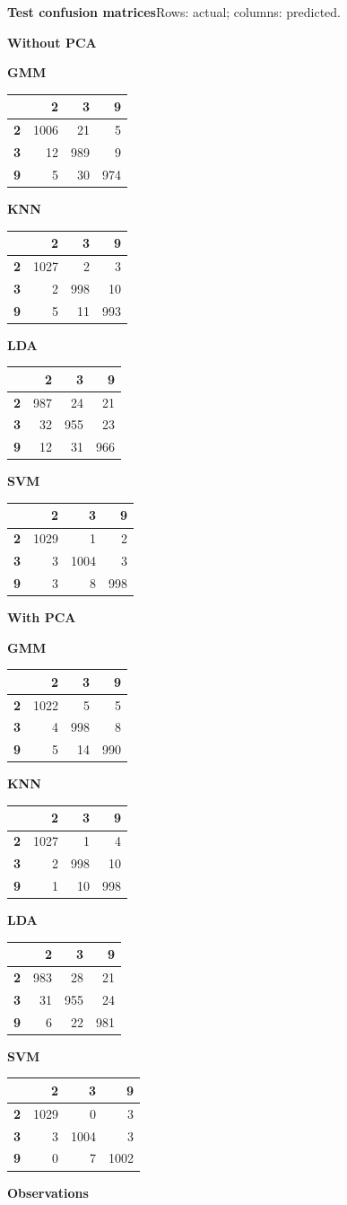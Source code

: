 \documentclass[11pt,a4paper]{article}
\makeatletter
\renewcommand{\arraystretch}{1.12}
\newcommand{\sectiongap}{\par\vspace{9mm}}
\newcommand{\confusion}[3]{%
  \begin{minipage}[t]{0.24\linewidth}
  \setlength{\parskip}{0pt}\centering
  \textbf{#1}\par\vspace{4pt}
  {\normalsize\setlength{\tabcolsep}{2.5pt}%
  \renewcommand{\arraystretch}{1.02}%
  \begin{tabular}{r@{\quad}#2}\toprule
  #3
  \bottomrule\end{tabular}}
  \end{minipage}}
\makeatother
\begin{document}
\noindent\begin{minipage}{\linewidth}
\textbf{Test confusion matrices}\hfill{\footnotesize Rows: actual; columns: predicted.}\par\smallskip
\textbf{Without PCA}\par\smallskip
\confusion{GMM}{rrr}{
 & \textbf{2} & \textbf{3} & \textbf{9} \\ \midrule
\textbf{2} & 1006 & 21 & 5 \\
\textbf{3} & 12 & 989 & 9 \\
\textbf{9} & 5 & 30 & 974 \\
}\hfill
\confusion{KNN}{rrr}{
 & \textbf{2} & \textbf{3} & \textbf{9} \\ \midrule
\textbf{2} & 1027 & 2 & 3 \\
\textbf{3} & 2 & 998 & 10 \\
\textbf{9} & 5 & 11 & 993 \\
}\hfill
\confusion{LDA}{rrr}{
 & \textbf{2} & \textbf{3} & \textbf{9} \\ \midrule
\textbf{2} & 987 & 24 & 21 \\
\textbf{3} & 32 & 955 & 23 \\
\textbf{9} & 12 & 31 & 966 \\
}\hfill
\confusion{SVM}{rrr}{
 & \textbf{2} & \textbf{3} & \textbf{9} \\ \midrule
\textbf{2} & 1029 & 1 & 2 \\
\textbf{3} & 3 & 1004 & 3 \\
\textbf{9} & 3 & 8 & 998 \\
}
\par\medskip
\textbf{With PCA}\par\smallskip
\confusion{GMM}{rrr}{
 & \textbf{2} & \textbf{3} & \textbf{9} \\ \midrule
\textbf{2} & 1022 & 5 & 5 \\
\textbf{3} & 4 & 998 & 8 \\
\textbf{9} & 5 & 14 & 990 \\
}\hfill
\confusion{KNN}{rrr}{
 & \textbf{2} & \textbf{3} & \textbf{9} \\ \midrule
\textbf{2} & 1027 & 1 & 4 \\
\textbf{3} & 2 & 998 & 10 \\
\textbf{9} & 1 & 10 & 998 \\
}\hfill
\confusion{LDA}{rrr}{
 & \textbf{2} & \textbf{3} & \textbf{9} \\ \midrule
\textbf{2} & 983 & 28 & 21 \\
\textbf{3} & 31 & 955 & 24 \\
\textbf{9} & 6 & 22 & 981 \\
}\hfill
\confusion{SVM}{rrr}{
 & \textbf{2} & \textbf{3} & \textbf{9} \\ \midrule
\textbf{2} & 1029 & 0 & 3 \\
\textbf{3} & 3 & 1004 & 3 \\
\textbf{9} & 0 & 7 & 1002 \\
}
\sectiongap
\textbf{Observations}\par


\end{minipage}
\end{document}
